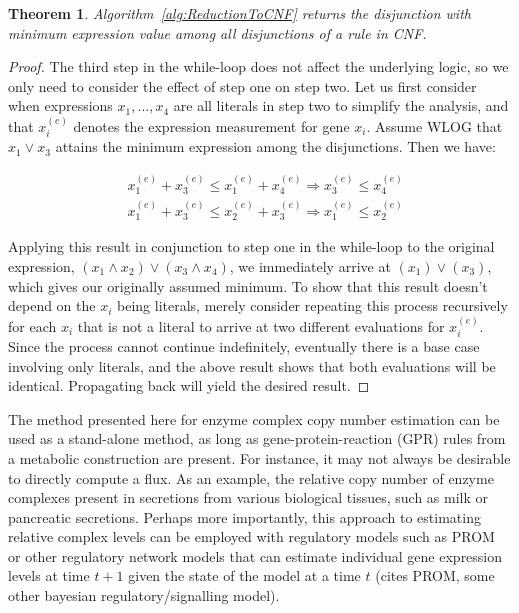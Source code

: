 \documentclass[phd,tocprelim]{cornell}
\newtheorem{Theorem}{Theorem}
\theoremstyle{break}
\begin{document}
\begin{Theorem}
\label{thm:ReductionToCNF}
Algorithm~\ref{alg:ReductionToCNF} returns the disjunction with
minimum expression value among all disjunctions of a rule in CNF.
\end{Theorem}

\begin{proof}
The third step in the while-loop does not affect the
underlying logic, so we only need to consider the effect of step one
on step two.  Let us first consider when expressions $x_1, ..., x_4$
are all literals in step two to simplify the analysis, and that
$x_i^{(e)}$ denotes the expression measurement for gene $x_i$. Assume
WLOG that $x_1 \lor x_3$ attains the minimum expression among the
disjunctions. Then we have:

\begin{align*}
&x_{1}^{(e)} + x_{3}^{(e)} \leq x_{1}^{(e)} + x_{4}^{(e)} \Rightarrow x_{3}^{(e)} \leq x_{4}^{(e)} \\
&x_{1}^{(e)} + x_{3}^{(e)} \leq x_{2}^{(e)} + x_{3}^{(e)} \Rightarrow x_{1}^{(e)} \leq x_{2}^{(e)} 
\end{align*}

Applying this result in conjunction to step one in the while-loop to
the original expression, $(x_1 \land x_2) \lor (x_3 \land x_4)$, we
immediately arrive at $(x_1) \lor (x_3)$, which gives our originally
assumed minimum. To show that this result doesn't depend on the $x_i$
being literals, merely consider repeating this process recursively for
each $x_i$ that is not a literal to arrive at two different
evaluations for $x_i^{(e)}$. Since the process cannot continue
indefinitely, eventually there is a base case involving only literals,
and the above result shows that both evaluations will be
identical. Propagating back will yield the desired result.
\end{proof}

The method presented here for enzyme complex copy number estimation can be used as a stand-alone method,
as long as gene-protein-reaction (GPR) rules from a metabolic construction are present. For instance, it 
may not always be desirable to directly compute a flux. As an example, the relative copy number of
enzyme complexes present in secretions from various biological tissues, such as milk or pancreatic
secretions. Perhaps more importantly, this approach to estimating relative complex levels can be employed
with regulatory models such as PROM or other regulatory network models that can estimate individual gene
expression levels at time $t+1$ given the state of the model at a time $t$ (cites PROM, some other bayesian
regulatory/signalling model).
\end{document}
